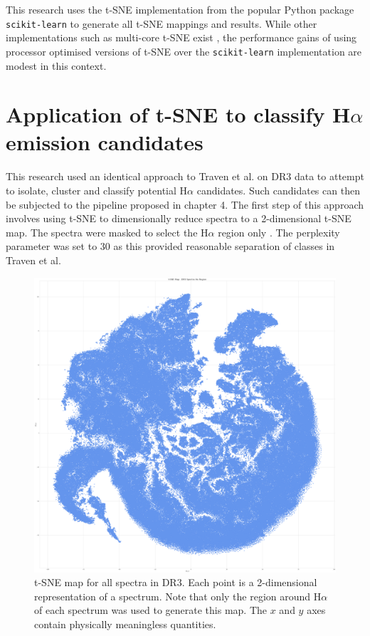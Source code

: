 This research uses the t-SNE implementation from the popular Python package \texttt{scikit-learn} to generate all t-SNE mappings and results. While other implementations such as multi-core t-SNE exist \cite{Ulyanov2016}, the performance gains of using processor optimised versions of t-SNE over the \texttt{scikit-learn} implementation are modest in this context.

\section{Application of t-SNE to classify H$\alpha$ emission candidates}

This research used an identical approach to Traven et al. on DR3 data to attempt to isolate, cluster and classify potential H$\alpha$ candidates. Such candidates can then be subjected to the pipeline proposed in chapter 4. The first step of this approach involves using t-SNE to dimensionally reduce spectra to a 2-dimensional t-SNE map. The spectra were masked to select the H$\alpha$ region only \cite{traven2017galah}. The perplexity parameter was set to 30 as this provided reasonable separation of classes in Traven et al.

\begin{figure}[h]
\centering
\includegraphics[scale=0.12]{figures/t-sne halpha masked.png}
\caption{t-SNE map for all spectra in DR3. Each point is a 2-dimensional representation of a spectrum. Note that only the region around H$\alpha$ of each spectrum was used to generate this map. The $x$ and $y$ axes contain physically meaningless quantities.}
\end{figure}

